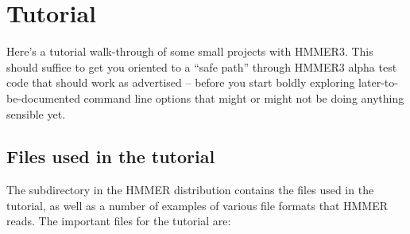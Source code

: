 
\section{Tutorial}
\label{section:tutorial}

Here's a tutorial walk-through of some small projects with
HMMER3. This should suffice to get you oriented to a ``safe path''
through HMMER3 alpha test code that should work as advertised -- before
you start boldly exploring later-to-be-documented command line options
that might or might not be doing anything sensible yet.


\subsection{Files used in the tutorial}

The subdirectory  in the HMMER distribution contains the
files used in the tutorial, as well as a number of examples of various
file formats that HMMER reads. The important files for the tutorial
are:


